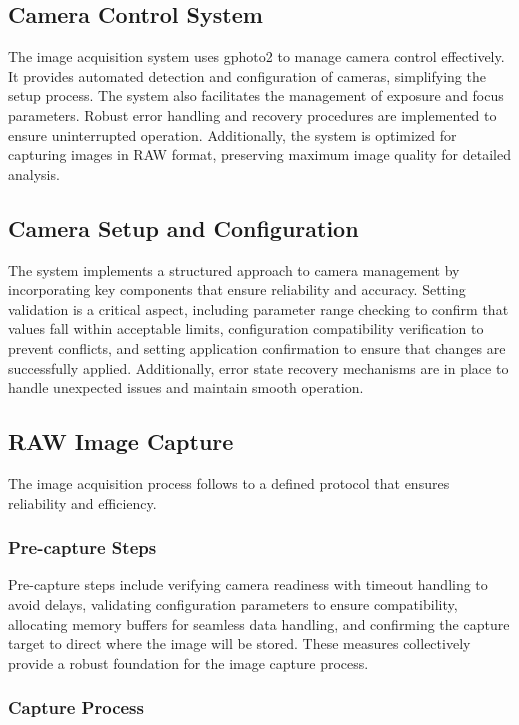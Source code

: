 \subsection{Camera Control System}
The image acquisition system uses gphoto2 to manage camera control effectively. It provides automated detection and configuration of cameras, simplifying the setup process. The system also facilitates the management of exposure and focus parameters. Robust error handling and recovery procedures are implemented to ensure uninterrupted operation. Additionally, the system is optimized for capturing images in RAW format, preserving maximum image quality for detailed analysis.

\subsection{Camera Setup and Configuration}
The system implements a structured approach to camera management by incorporating key components that ensure reliability and accuracy. Setting validation is a critical aspect, including parameter range checking to confirm that values fall within acceptable limits, configuration compatibility verification to prevent conflicts, and setting application confirmation to ensure that changes are successfully applied. Additionally, error state recovery mechanisms are in place to handle unexpected issues and maintain smooth operation.

\subsection{RAW Image Capture}
The image acquisition process follows to a defined protocol that ensures reliability and efficiency.

\subsubsection{Pre-capture Steps}
Pre-capture steps include verifying camera readiness with timeout handling to avoid delays, validating configuration parameters to ensure compatibility, allocating memory buffers for seamless data handling, and confirming the capture target to direct where the image will be stored. These measures collectively provide a robust foundation for the image capture process.

\subsubsection{Capture Process}

